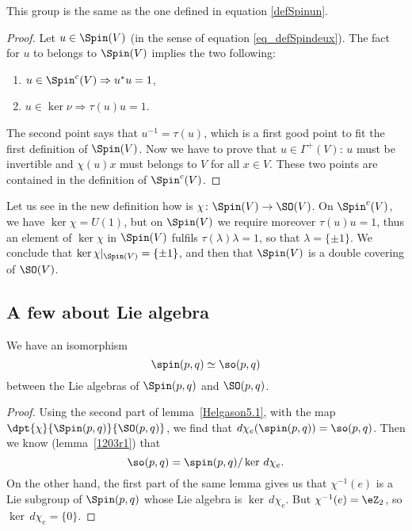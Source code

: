 \begin{lemma}
	This group is the same as the one defined in equation \eqref{defSpinun}.
\end{lemma}

\begin{proof}
	Let $u\in\Spin(V)$ (in the sense of equation \eqref{eq_defSpindeux}). The fact for $u$ to belongs to $\Spin(V)$ implies the two following:
	\begin{enumerate}
		\item $u\in\Spin^{c}(V)\Rightarrow u^*u=1$,
		\item $u\in\ker\nu\Rightarrow \tau(u)u=1$.
	\end{enumerate}
	The second point says that $u^{-1}=\tau(u)$, which is a first good point to fit the first definition of $\Spin(V)$. Now we have to prove that $u\in\Gamma^{+}(V)$: $u$ must be invertible and $\chi(u)x$ must belongs to $V$ for all $x\in V$. These two points are contained in the definition of $\Spin^{c}(V)$.
\end{proof}
Let us see in the new definition how is $\chi\colon \Spin(V)\to \SO(V)$. On $\Spin^{c}(V)$, we have $\ker\chi=U(1)$, but on $\Spin(V)$ we require moreover $\tau(u)u=1$, thus an element of $\ker\chi$ in $\Spin(V)$ fulfils $\tau(\lambda)\lambda=1$, so that $\lambda=\{ \pm1 \}$. We conclude that $\ker\chi|_{\Spin(V)}=\{ \pm 1 \}$, and then that $\Spin(V)$ is a double covering of $\SO(V)$.


\subsection{A few about Lie algebra}

\begin{proposition}
	We have an isomorphism
	\[
		\spin(p,q)\simeq\so(p,q)
	\]
	between the Lie algebras of $\Spin(p,q)$ and $\SO(p,q)$.
	\label{prop:spin_so}
\end{proposition}

\begin{proof}
	Using the second part of lemma~\ref{Helgason5.1}, with the map $\dpt{\chi}{\Spin(p,q)}{\SO(p,q)}$, we find that $d\chi_e(\spin(p,q))=\so(p,q)$. Then we know (lemma~\ref{1203r1}) that
	\[
		\so(p,q)=\spin(p,q)/\ker\,d\chi_e.
	\]
	On the other hand, the first part of the same lemma gives us that $\chi^{-1}(e)$ is a Lie subgroup of $\Spin(p,q)$ whose Lie algebra is $\ker\,d\chi_e$. But $\chi^{-1}(e)=\eZ_2$, so $\ker\,d\chi_e=\{0\}$.
\end{proof}

